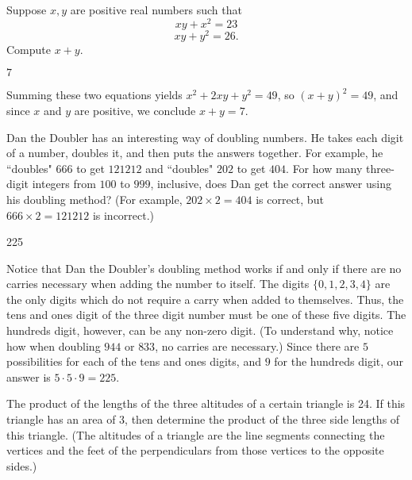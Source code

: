 \documentclass[11pt]{article}
\begin{document}
\begin{problem}
Suppose $x,y$ are positive real numbers such that \[ xy + x^2 = 23 \]  \[ xy + y^2 = 26.\] Compute $x+y$.
\end{problem}

\begin{answer}
$7$
\end{answer}

\begin{solution}
Summing these two equations yields $x^2 + 2xy + y^2 = 49$, so $(x+y)^2 = 49$, and since $x$ and $y$ are positive, we conclude $x+y = \boxed{7}$.
\end{solution}


\begin{problem}
Dan the Doubler has an interesting way of doubling numbers. He takes each digit of a number, doubles it, and then puts the answers together. 
For example, he ``doubles" $666$ to get $121212$ and ``doubles" $202$ to get $404$. For how many three-digit integers from $100$ to $999$,
inclusive, does Dan get the correct answer using his doubling method? (For example, $202 \times 2 = 404$ is correct, but $666 \times 2 = 121212$ is incorrect.)
\end{problem}

\begin{answer}
225
\end{answer}

\begin{solution}
Notice that Dan the Doubler's doubling method works if and only if there are no carries necessary when adding the number to itself. The digits $\{0, 1, 2, 3, 4\}$ are the only digits which do not require a carry when added to themselves. Thus, the tens and ones digit of the three digit number must be one of these five digits. The hundreds digit, however, can be any non-zero digit. (To understand why, notice how when doubling $944$ or $833$, no carries are necessary.) Since there are $5$ possibilities for each of the tens and ones digits, and $9$ for the hundreds digit, our answer is $5 \cdot 5 \cdot 9 = \boxed{225}$.
\end{solution}


\begin{problem}
The product of the lengths of the three altitudes of a certain triangle is 24. If this triangle has an area of 3, then determine the product of the three side lengths of this triangle.  (The altitudes of a triangle are the line segments connecting the vertices and the feet of the perpendiculars from those vertices to the opposite sides.) %
\end{problem}
\end{document}
